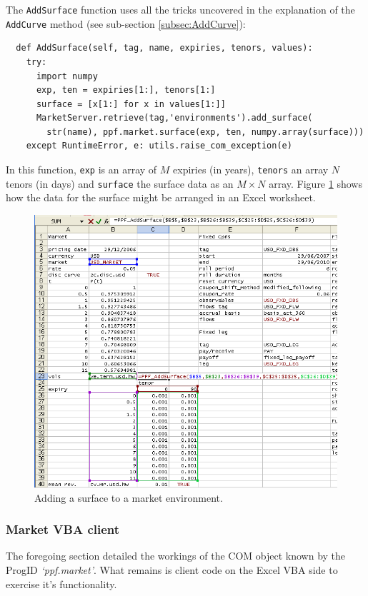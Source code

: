 The \verb|AddSurface| function uses all the tricks uncovered in the
explanation of the \verb|AddCurve| method (see sub-section
\ref{subsec:AddCurve}):
\begin{verbatim}
  def AddSurface(self, tag, name, expiries, tenors, values):
    try:
      import numpy
      exp, ten = expiries[1:], tenors[1:]
      surface = [x[1:] for x in values[1:]]
      MarketServer.retrieve(tag,'environments').add_surface(
        str(name), ppf.market.surface(exp, ten, numpy.array(surface)))
    except RuntimeError, e: utils.raise_com_exception(e)
\end{verbatim}
In this function, \verb|exp| is an array of $M$ expiries (in years),
\verb|tenors| an array $N$ tenors (in days) and \verb|surface| the
surface data as an $M \times N$ array. Figure
\ref{fig:add-surface-to-market} shows how the data for the surface
might be arranged in an Excel worksheet.
\begin{figure} \centering
\includegraphics[scale=0.5]{img/market_server.PNG}
\caption{Adding a surface to a market environment.}
\label{fig:add-surface-to-market}
\end{figure}

\subsubsection{Market VBA client}

The foregoing section detailed the workings of the COM object known by
the ProgID \emph{`ppf.market'}. What remains is client code on the Excel
VBA side to exercise it's functionality.

